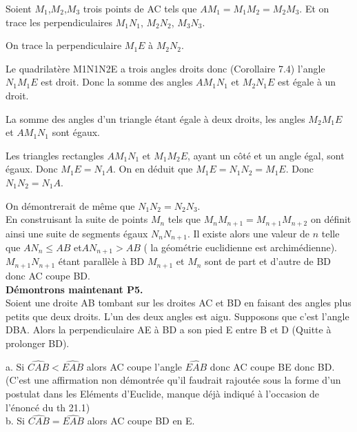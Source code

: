 \documentclass[a4paper, 12pt, twoside]{book}
\begin{document}
 

 

 
Soient $M_{1}$,$M_{2}$,$M_{3}$ trois points de AC tels que $AM_{1}=M_{1}M_{2}=M_{2}M_{3}$. Et on trace les perpendiculaires $M_{1}N_{1}$, $M_{2}N_{2}$, $M_{3}N_{3}$.\

On trace la perpendiculaire $M_{1}E$ à $M_{2}N_{2}$.\


 

 
 Le quadrilatère M1N1N2E a trois angles droits donc (Corollaire 7.4) l'angle $N_{1}M_{1}E$ est droit. Donc la somme des angles $AM_{1}N_{1}$ et $M_{2}N_{1}E$ est égale à un droit.\
 
 La somme des angles d'un triangle étant égale à deux droits, les angles $M_{2}M_{1}E$ et $AM_{1}N_{1}$ sont égaux.\
 
  Les triangles rectangles $AM_{1}N_{1}$ et $M_{1}M_{2}E$, ayant un côté et un angle égal, sont égaux. Donc  $M_{1}E=N_{1}A$.  On en déduit que $M_{1}E=N_{1}N_{2}=M_{1}E$. Donc  $N_{1}N_{2}=N_{1}A$.\
  
 On démontrerait de même que $N_{1}N_{2}=N_{2}N_{3}$.\\
 
 
 En construisant la suite de points $M_{n}$ tels que $M_{n}M_{n+1}=M_{n+1}M_{n+2}$ on définit ainsi une suite de segments égaux $N_{n}N_{n+1}$. Il existe alors une valeur de $n$ telle que $AN_{n}\leq AB$ et$AN_{n+1}> AB$ ( la géométrie euclidienne est archimédienne). $M_{n+1}N_{n+1}$ étant parallèle à BD $M_{n+1}$ et $M_{n}$ sont de part et d'autre de BD donc AC coupe BD.\\
 
\textbf{Démontrons maintenant P5.}\\

 
 Soient une droite AB tombant sur les droites AC et BD en faisant des angles plus petits que deux droits. L'un des deux angles est aigu. Supposons que c'est l'angle DBA. Alors la perpendiculaire AE à BD a son pied E entre B et D (Quitte à prolonger BD).\
 
 a. Si $\hat{CAB}<\hat{EAB}$ alors AC coupe l'angle $\hat{EAB}$ donc AC coupe BE donc BD. (C'est une affirmation non démontrée qu'il faudrait rajoutée sous la forme d'un postulat dans les Eléments d'Euclide, manque déjà indiqué à l'occasion de l'énoncé du th 21.1)\\
 
 b. Si $\hat{CAB}=\hat{EAB}$ alors AC coupe BD en E.\\
 
\end{document}
